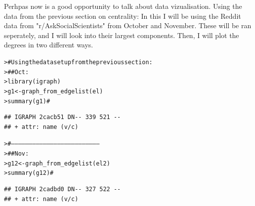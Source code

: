 \documentclass[12pt]{article}\usepackage[]{graphicx}\usepackage[]{color}
\makeatletter
\newcommand{\hlcom}[1]{\textcolor[rgb]{0.404,0.408,0.42}{#1}}%
\newcommand{\hlstd}[1]{\textcolor[rgb]{0.882,0.878,0.898}{#1}}%
\newcommand{\hlkwb}[1]{\textcolor[rgb]{0.902,0.675,0.196}{#1}}%
\newcommand{\hlkwd}[1]{\textcolor[rgb]{0.733,0.388,0.812}{#1}}%
\newenvironment{kframe}{%
 \def\at@end@of@kframe{}%
 \ifinner\ifhmode%
  \def\at@end@of@kframe{\end{minipage}}%
  \begin{minipage}{\columnwidth}%
 \fi\fi%
 \def\FrameCommand##1{\hskip\@totalleftmargin \hskip-\fboxsep
 \colorbox{shadecolor}{##1}\hskip-\fboxsep
     \hskip-\linewidth \hskip-\@totalleftmargin \hskip\columnwidth}%
 \MakeFramed {\advance\hsize-\width
   \@totalleftmargin\z@ \linewidth\hsize
   \@setminipage}}%
 {\par\unskip\endMakeFramed%
 \at@end@of@kframe}
\newenvironment{knitrout}{}{} %
\makeatother
\begin{document}
\begin{flushleft}
Perhpas now is a good opportunity to talk about data vizualisation. Using the data from the previous section on centrality:
In this I will be using the Reddit data from "r/AskSocialScientists" from October and November. These will be ran seperately, and I will look into their largest components. Then, I will plot the degrees in two different ways.

\begin{knitrout}
\color{fgcolor}\begin{kframe}
\begin{alltt}
\hlstd{> }\hlcom{# Using the data set up from the previous section:}
\hlstd{> }\hlcom{##    Oct:}
\hlstd{> }\hlkwd{library}\hlstd{(igraph)}
\hlstd{> }\hlstd{g1} \hlkwb{<-} \hlkwd{graph_from_edgelist}\hlstd{(el)}
\hlstd{> }\hlkwd{summary}\hlstd{(g1)} \hlcom{#}
\end{alltt}
\begin{verbatim}
## IGRAPH 2cacb51 DN-- 339 521 -- 
## + attr: name (v/c)
\end{verbatim}
\begin{alltt}
\hlstd{> }\hlcom{#---------------------------------------------------------------------------}
\hlstd{> }\hlcom{##   Nov:}
\hlstd{> }\hlstd{g12} \hlkwb{<-} \hlkwd{graph_from_edgelist}\hlstd{(el2)}
\hlstd{> }\hlkwd{summary}\hlstd{(g12)} \hlcom{#}
\end{alltt}
\begin{verbatim}
## IGRAPH 2cadbd0 DN-- 327 522 -- 
## + attr: name (v/c)
\end{verbatim}
\end{kframe}
\end{knitrout}


\end{flushleft}
\end{document}
